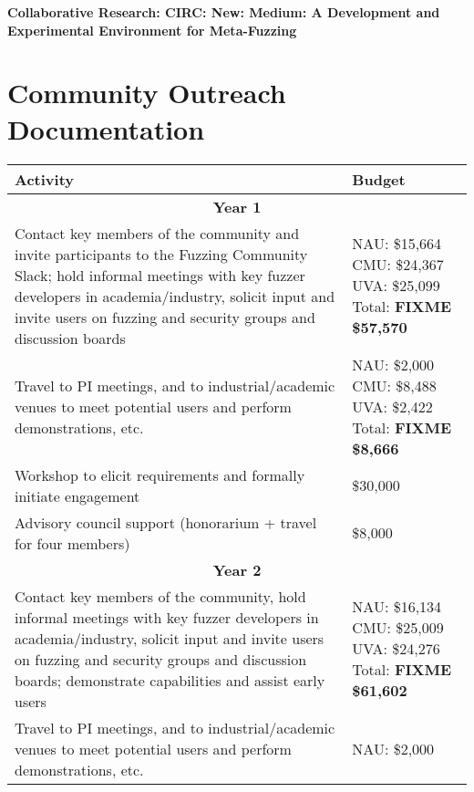 \documentclass[12pt]{article}
\begin{document}
\begin{center} {\Large\sf\textbf{Collaborative Research: CIRC: New: Medium: A
      Development and Experimental Environment for Meta-Fuzzing}}
\end{center}

\section*{Community Outreach Documentation}


\begin{table}
  \begin{tabular}{|p{12cm}|p{3cm}|}
    \hline
    {\bf Activity} & {\bf Budget} \\
    \hline 
    \multicolumn{2}{c}{{\bf Year 1}} \\
    \hline
    Contact key members of the community and invite participants to the
    Fuzzing Community Slack; hold informal meetings with
    key fuzzer developers in academia/industry, solicit input and
    invite users
    on fuzzing and security groups and discussion boards &  NAU: \$15,664 CMU: \$24,367  UVA: \$25,099
                                                      Total: \textbf{FIXME \$57,570} \\
    \hline
    Travel to PI meetings, and to industrial/academic venues to meet
    potential users and perform demonstrations, etc. & NAU: \$2,000
                                                       CMU: \$8,488 UVA:
                                                       \$2,422 Total: \textbf{FIXME \$8,666}\\
    \hline
    Workshop to elicit requirements and formally initiate engagement
& \$30,000 \\
    \hline 
    Advisory council support (honorarium + travel for four members) 
  & \$8,000 \\
    \hline
    \hline
    \multicolumn{2}{c}{{\bf Year 2}} \\
    \hline
    \hline
    Contact key members of the community, hold informal meetings with
    key fuzzer developers in academia/industry, solicit input and
    invite users
    on fuzzing and security groups and discussion boards; demonstrate
    capabilities and assist early users&  NAU:  \$16,134 CMU:  \$25,009 UVA: \$24,276
                                                      Total: \textbf{FIXME \$61,602}  \\
    \hline
    Travel to PI meetings, and to industrial/academic venues to meet
    potential users and perform demonstrations, etc. & NAU: \$2,000

\end{tabular}
\end{table}
\end{document}
